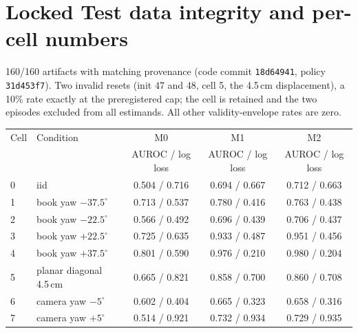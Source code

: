 \documentclass[11pt,a4paper]{article}
\newcommand{\Mz}{M0}\newcommand{\Mo}{M1}\newcommand{\Mt}{M2}
\begin{document}
\section{Locked Test data integrity and per-cell numbers}
\label{app:integrity}
160/160 artifacts with matching provenance (code commit \texttt{18d64941}, policy \texttt{31d453f7}). Two invalid resets (init 47 and 48, cell 5, the 4.5\,cm displacement), a 10\% rate exactly at the preregistered cap; the cell is retained and the two episodes excluded from all estimands. All other validity-envelope rates are zero.
\begin{center}\small
\begin{tabular}{llccc}
\toprule
Cell & Condition & \Mz{} & \Mo{} & \Mt{} \\
& & AUROC / log loss & AUROC / log loss & AUROC / log loss \\
\midrule
0 & iid & 0.504 / 0.716 & 0.694 / 0.667 & 0.712 / 0.663 \\
1 & book yaw $-37.5^\circ$ & 0.713 / 0.537 & 0.780 / 0.416 & 0.763 / 0.438 \\
2 & book yaw $-22.5^\circ$ & 0.566 / 0.492 & 0.696 / 0.439 & 0.706 / 0.437 \\
3 & book yaw $+22.5^\circ$ & 0.725 / 0.635 & 0.933 / 0.487 & 0.951 / 0.456 \\
4 & book yaw $+37.5^\circ$ & 0.801 / 0.590 & 0.976 / 0.210 & 0.980 / 0.204 \\
5 & planar diagonal 4.5\,cm & 0.665 / 0.821 & 0.858 / 0.700 & 0.860 / 0.708 \\
6 & camera yaw $-5^\circ$ & 0.602 / 0.404 & 0.665 / 0.323 & 0.658 / 0.316 \\
7 & camera yaw $+5^\circ$ & 0.514 / 0.921 & 0.732 / 0.934 & 0.729 / 0.935 \\
\bottomrule
\end{tabular}
\end{center}
\end{document}
